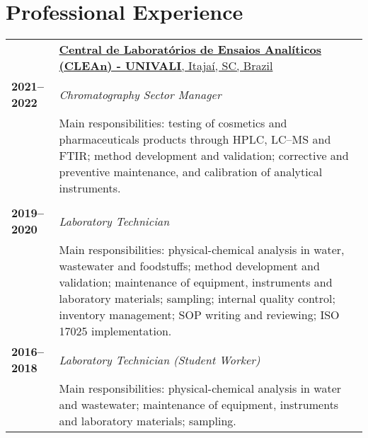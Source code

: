 \documentclass[10pt, twoside, table]{article} %
\begin{document}
\vfill


\newpage

\section*{Professional Experience}

\begin{tabularx}{\textwidth}{>{\columncolor{lightblue}}p{1.8cm}X}  %
  \centering\textbf{} &
   \href{http://www.univali.br/institucional/vice-reitoria-planejamento-desenvolvimento-institucional/coordenadoria-de-projetos-e-prestacao-de-servicos/portfolio-de-servicos/analises-laboratoriais/Paginas/central-de-laboratorios-de-ensaios-analiticos-clean.aspx}{\textbf{Central de Laboratórios de Ensaios Analíticos (CLEAn) - UNIVALI}, Itaja\'i, SC, Brazil} \\
  \centering\textbf{2021--2022}
  & \textit{Chromatography Sector Manager} \vspace{0.1cm}\\
  & Main responsibilities: testing of cosmetics and pharmaceuticals products through HPLC, LC--MS and FTIR; method development and validation; corrective and preventive maintenance, and calibration of analytical instruments. \\

  \\

  \centering\textbf{2019--2020}
  & \textit{Laboratory Technician} \vspace{0.1cm} \\
  & Main responsibilities: physical-chemical analysis in water, wastewater and foodstuffs; method development and validation; maintenance of equipment, instruments and laboratory materials; sampling; internal quality control; inventory management; SOP writing and reviewing; ISO 17025 implementation.

  \\

  \centering\textbf{2016--2018}
  & \textit{Laboratory Technician (Student Worker)} \vspace{0.1cm} \\
  & Main responsibilities: physical-chemical analysis in water and wastewater; maintenance of equipment, instruments and laboratory materials; sampling.
\end{tabularx}
\end{document}
